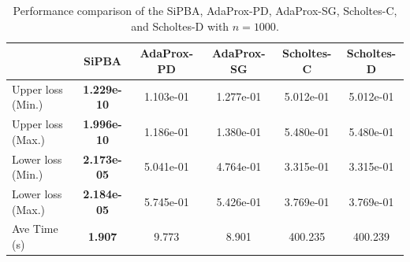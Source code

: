 \begin{table}[htbp]
	\caption{Performance comparison of the SiPBA, AdaProx-PD, AdaProx-SG, Scholtes-C, and Scholtes-D with $n=1000$.}
	\label{tab:dimension1000}
	\scriptsize
	\setlength{\tabcolsep}{3pt}
	\begin{tabular*}{\textwidth}{@{\extracolsep{\fill}}lccccc}
		\hline
		& SiPBA & AdaProx-PD & AdaProx-SG & Scholtes-C & Scholtes-D \\
		\hline
		Upper loss (Min.) & \textbf{1.229e-10} & 1.103e-01 & 1.277e-01 & 5.012e-01 & 5.012e-01 \\
		Upper loss (Max.) & \textbf{1.996e-10} & 1.186e-01 & 1.380e-01 & 5.480e-01 & 5.480e-01 \\
		Lower loss (Min.) & \textbf{2.173e-05} & 5.041e-01 & 4.764e-01 & 3.315e-01 & 3.315e-01 \\
		Lower loss (Max.) & \textbf{2.184e-05} & 5.745e-01 & 5.426e-01 & 3.769e-01 & 3.769e-01 \\
		Ave Time (s) & \textbf{1.907} & 9.773 & 8.901 & 400.235 & 400.239 \\
		\hline
	\end{tabular*}
\end{table}
